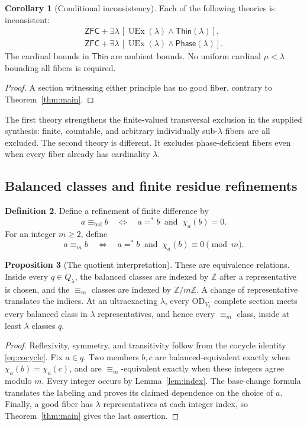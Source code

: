 \documentclass[11pt,letterpaper]{article}
\theoremstyle{definition}
\newtheorem{definition}{Definition}[section]
\newtheorem{proposition}[definition]{Proposition}
\newtheorem{corollary}[definition]{Corollary}
\newcommand{\ZFC}{\mathsf{ZFC}}
\newcommand{\OD}{\mathrm{OD}}
\newcommand{\UEx}{\operatorname{UEx}}
\numberwithin{equation}{section}
\newcommand{\ZZ}{\mathbb Z}
\newcommand{\ch}{\chi}
\newcommand{\Thin}{\mathsf{Thin}}
\newcommand{\Phase}{\mathsf{Phase}}
\newcommand{\eqfin}{\mathrel{=^{*}}}
\newcommand{\eqbal}{\mathrel{\equiv_{\mathrm{bal}}}}
\begin{document}
\begin{corollary}[Conditional inconsistency]\label{cor:inconsistent}
Each of the following theories is inconsistent:
\begin{align}
\ZFC+\exists\lambda\,[\UEx(\lambda)\wedge\Thin(\lambda)],\label{eq:thin-inconsistent}\\
\ZFC+\exists\lambda\,[\UEx(\lambda)\wedge\Phase(\lambda)].\label{eq:phase-inconsistent}
\end{align}
The cardinal bounds in $\Thin$ are ambient bounds. No uniform cardinal $\mu<\lambda$ bounding all fibers is required.
\end{corollary}
\begin{proof}
A section witnessing either principle has no good fiber, contrary to Theorem~\ref{thm:main}.
\end{proof}

The first theory strengthens the finite-valued transversal exclusion in the supplied synthesis: finite, countable, and arbitrary individually sub-$\lambda$ fibers are all excluded. The second theory is different. It excludes phase-deficient fibers even when every fiber already has cardinality $\lambda$.

\subsection{Balanced classes and finite residue refinements}

\begin{definition}\label{def:balanced}
Define a refinement of finite difference by
\[
a\eqbal b\quad\Longleftrightarrow\quad a\eqfin b\ \text{ and }\ \ch_a(b)=0.
\]
For an integer $m\ge2$, define
\[
a\equiv_m b\quad\Longleftrightarrow\quad a\eqfin b\ \text{ and }\ \ch_a(b)\equiv0\pmod m.
\]
\end{definition}

\begin{proposition}[The quotient interpretation]\label{prop:balanced}
These are equivalence relations. Inside every $q\in Q_\lambda$, the balanced classes are indexed by $\ZZ$ after a representative is chosen, and the $\equiv_m$ classes are indexed by $\ZZ/m\ZZ$. A change of representative translates the indices. At an ultraexacting $\lambda$, every $\OD_{V_\lambda}$ complete section meets every balanced class in $\lambda$ representatives, and hence every $\equiv_m$ class, inside at least $\lambda$ classes $q$.
\end{proposition}
\begin{proof}
Reflexivity, symmetry, and transitivity follow from the cocycle identity \eqref{eq:cocycle}. Fix $a\in q$. Two members $b,c$ are balanced-equivalent exactly when $\ch_a(b)=\ch_a(c)$, and are $\equiv_m$-equivalent exactly when these integers agree modulo $m$. Every integer occurs by Lemma~\ref{lem:index}. The base-change formula translates the labeling and proves its claimed dependence on the choice of $a$. Finally, a good fiber has $\lambda$ representatives at each integer index, so Theorem~\ref{thm:main} gives the last assertion.
\end{proof}
\end{document}
